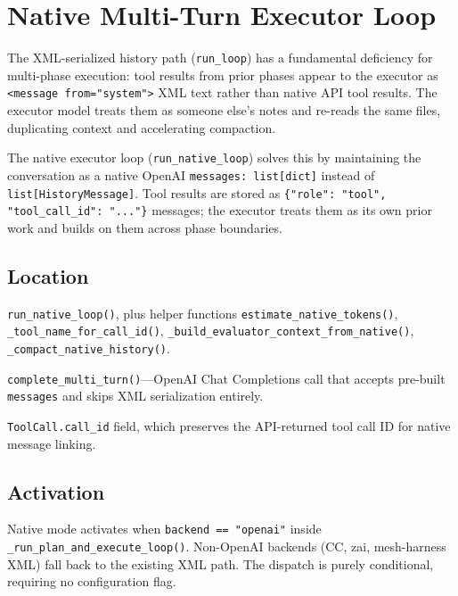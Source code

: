 \documentclass[11pt,letterpaper]{report}
\newcommand{\code}[1]{\texttt{#1}}
\begin{document}
\chapter{Native Multi-Turn Executor Loop}
\label{ch:native-loop}

The XML-serialized history path (\code{run\_loop}) has a fundamental
deficiency for multi-phase execution: tool results from prior phases appear
to the executor as \code{<message from="system">} XML text rather than
native API tool results. The executor model treats them as someone else's
notes and re-reads the same files, duplicating context and accelerating
compaction.

The native executor loop (\code{run\_native\_loop}) solves this
by maintaining the conversation as a native OpenAI \code{messages:
list[dict]} instead of \code{list[HistoryMessage]}. Tool results are
stored as \code{\{"role": "tool", "tool\_call\_id": "..."\}} messages; the
executor treats them as its own prior work and builds on them across phase
boundaries.

\section{Location}

\begin{description}[style=nextline]
  \item[\code{mesh/harness/loop.py}]
    \code{run\_native\_loop()}, plus helper functions
    \code{estimate\_native\_tokens()},
    \code{\_tool\_name\_for\_call\_id()},
    \code{\_build\_evaluator\_context\_from\_native()},
    \code{\_compact\_native\_history()}.
  \item[\code{mesh/llm.py}]
    \code{complete\_multi\_turn()}---OpenAI Chat
    Completions call that accepts pre-built \code{messages} and skips
    XML serialization entirely.
  \item[\code{mesh/tools.py}]
    \code{ToolCall.call\_id} field, which preserves the API-returned tool call
    ID for native message linking.
\end{description}

\section{Activation}

Native mode activates when \code{backend == "openai"} inside
\code{\_run\_plan\_and\_execute\_loop()}. Non-OpenAI backends
(CC, zai, mesh-harness XML) fall back to the existing XML path. The
dispatch is purely conditional, requiring no configuration flag.
\end{document}
